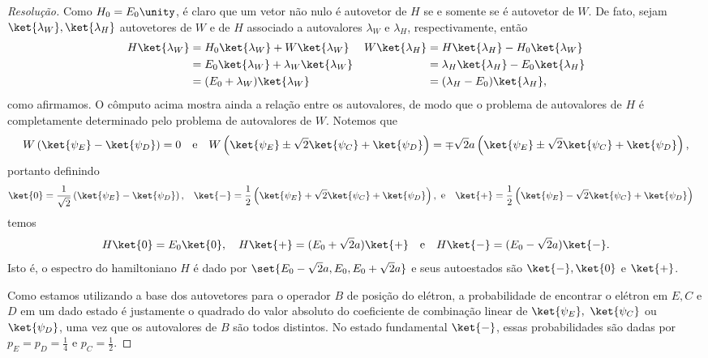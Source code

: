\begin{proof}[Resolução]
    Como \(H_0 = E_0 \unity\), é claro que um vetor não nulo é autovetor de \(H\) se e somente se é autovetor de \(W\). De fato, sejam \(\ket{\lambda_W}, \ket{\lambda_H}\) autovetores de \(W\) e de \(H\) associado a autovalores \(\lambda_W\) e \(\lambda_H\), respectivamente, então
    \begin{align*}
        H \ket{\lambda_W} &= H_0 \ket{\lambda_W} + W \ket{\lambda_W}&
        W \ket{\lambda_H} &= H \ket{\lambda_H} - H_0 \ket{\lambda_W}\\
                        &= E_0 \ket{\lambda_W} + \lambda_W \ket{\lambda_W}&
                        &= \lambda_H \ket{\lambda_H} - E_0 \ket{\lambda_H}\\
                        &= (E_0 + \lambda_W) \ket{\lambda_W}&
                        &= (\lambda_H - E_0) \ket{\lambda_H},
    \end{align*}
    como afirmamos. O cômputo acima mostra ainda a relação entre os autovalores, de modo que o problema de autovalores de \(H\) é completamente determinado pelo problema de autovalores de \(W\). Notemos que
    \begin{equation*}
        W \left(\ket{\psi_E} - \ket{\psi_D}\right) = 0
        \quad\text{e}\quad
        W \left(\ket{\psi_E} \pm \sqrt{2}\ket{\psi_C} + \ket{\psi_D}\right) = \mp\sqrt{2}a\left(\ket{\psi_E} \pm \sqrt{2}\ket{\psi_C} + \ket{\psi_D}\right),
    \end{equation*}
    portanto definindo
    \begin{align*}
        \ket{0} &= \frac{1}{\sqrt{2}} \left(\ket{\psi_E} - \ket{\psi_D}\right),&
        \ket{-} &= \frac{1}{2} \left(\ket{\psi_E} + \sqrt{2}\ket{\psi_C} + \ket{\psi_D}\right),\text{ e}&
        \ket{+} &= \frac{1}{2} \left(\ket{\psi_E} - \sqrt{2}\ket{\psi_C} + \ket{\psi_D}\right)
    \end{align*}
    temos
    \begin{equation*}
        H\ket{0} = E_0 \ket{0},\quad
        H\ket{+} = (E_0 + \sqrt{2} a) \ket{+}\quad\text{e}\quad
        H\ket{-} = (E_0 - \sqrt{2} a) \ket{-}.
    \end{equation*}
    Isto é, o espectro do hamiltoniano \(H\) é dado por \(\set{E_0 - \sqrt{2} a, E_0, E_0 + \sqrt{2}a}\) e seus autoestados são \(\ket{-}, \ket{0}\) e \(\ket{+}\).

    Como estamos utilizando a base dos autovetores para o operador \(B\) de posição do elétron, a probabilidade de encontrar o elétron em \(E, C\) e \(D\) em um dado estado é justamente o quadrado do valor absoluto do coeficiente de combinação linear de \(\ket{\psi_E},\) \(\ket{\psi_C}\) ou \(\ket{\psi_D}\), uma vez que os autovalores de \(B\) são todos distintos. No estado fundamental \(\ket{-}\), essas probabilidades são dadas por \(p_E = p_D = \frac{1}{4}\) e \(p_C = \frac{1}{2}\).


\end{proof}
